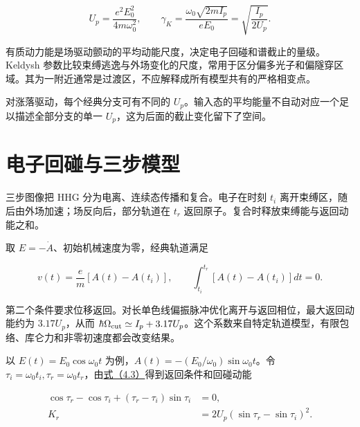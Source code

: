 \documentclass[UTF8,a4paper,zihao=-4,openany,fontset=fandol]{ctexbook}
\begin{document}
\begin{equation*}
U_p=\frac{e^2E_0^2}{4m\omega_0^2},\qquad
\gamma_K=\frac{\omega_0\sqrt{2mI_p}}{eE_0}
=\sqrt{\frac{I_p}{2U_p}}.
\tag{4.2}\label{eq:4.2}
\end{equation*}


有质动力能是场驱动颤动的平均动能尺度，决定电子回碰和谱截止的量级。Keldysh 参数比较束缚逃逸与外场变化的尺度，常用于区分偏多光子和偏隧穿区域。其为一附近通常是过渡区，不应解释成所有模型共有的严格相变点。



对涨落驱动，每个经典分支可有不同的 $U_p$。输入态的平均能量不自动对应一个足以描述全部分支的单一 $U_p$，这为后面的截止变化留下了空间。



\section{电子回碰与三步模型}\label{sec:04:4}


三步图像把 HHG 分为电离、连续态传播和复合。电子在时刻 $t_i$ 离开束缚区，随后由外场加速；场反向后，部分轨道在 $t_r$ 返回原子。复合时释放束缚能与返回动能之和。



取 $E=-\dot A$、初始机械速度为零，经典轨道满足



\begin{equation*}
v(t)=\frac e m[A(t)-A(t_i)],\qquad
\int_{t_i}^{t_r}[A(t)-A(t_i)]dt=0.
\tag{4.3}\label{eq:4.3}
\end{equation*}


第二个条件要求位移返回。对长单色线偏振脉冲优化离开与返回相位，最大返回动能约为 $3.17U_p$，从而 $\hbar\Omega_{\rm cut}\simeq I_p+3.17U_p$。这个系数来自特定轨道模型，有限包络、库仑力和非零初速度都会改变结果。



以 $E(t)=E_0\cos\omega_0t$ 为例，$A(t)=-(E_0/\omega_0)\sin\omega_0t$。令 $\tau_i=\omega_0t_i,\tau_r=\omega_0t_r$，由\hyperref[eq:4.3]{式（4.3）}得到返回条件和回碰动能



\begin{equation*}
\begin{aligned}
\cos\tau_r-\cos\tau_i+(\tau_r-\tau_i)\sin\tau_i&=0,\\
K_r&=2U_p(\sin\tau_r-\sin\tau_i)^2 .
\end{aligned}
\tag{4.3a}\label{eq:4.3a}
\end{equation*}
\end{document}
